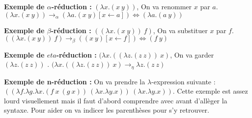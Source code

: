 \documentclass[10pt,a4paper]{report}
\begin{document}
\textbf{Exemple de $\alpha$-réduction :} $(\lambda x.(x~y)) $, On va renommer $x$ par $a$. $(\lambda x.(x~y)) \rightarrow_{\alpha} (\lambda a.(x~y)[x \leftarrow a]) \Longleftrightarrow (\lambda a.(a~y))$ 
\medbreak

\textbf{Exemple de $\beta$-réduction :} $((\lambda x.(x~y))~f)$, On va substituer $x$ par $f$. $((\lambda x.(x~y))~f) \rightarrow_{\beta} ((x~y)[x \leftarrow f]) \Longleftrightarrow (f~y)$ 
\medbreak

\textbf{Exemple de $eta$-réduction :} $(\lambda x.((\lambda z.(z~z))~x)$, On va garder $(\lambda z.(z~z))$ . $(\lambda x.((\lambda z.(z~z))~x) \rightarrow_{\eta} \lambda z.(z~z)$ 
\medbreak

\textbf{Exemple de \textbf{n}-réduction :} On va prendre la $\lambda$-expression suivante : $((\lambda f.\lambda g.\lambda x.(f~x~(g~x))~(\lambda x.\lambda y.x))~(\lambda x.\lambda y.x))$. Cette exemple est assez lourd visuellement mais il faut d'abord comprendre avec avant d'allèger la syntaxe. Pour aider on va indicer les parenthèses pour s'y retrouver. 
\smallbreak
\end{document}

